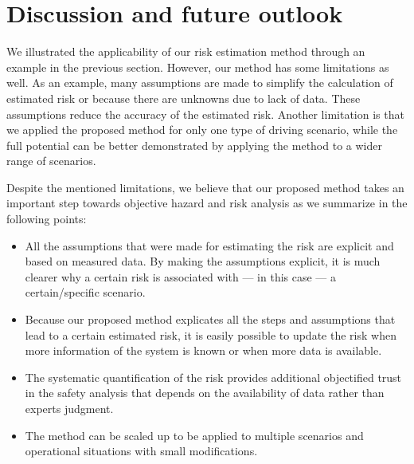 \section{Discussion and future outlook} %
\label{sec:discussion}



We illustrated the applicability of our risk estimation method through an example in the previous section. 
However, our method has some limitations as well. 
As an example, many assumptions are made to simplify the calculation of estimated risk or because there are unknowns due to lack of data. These assumptions reduce the accuracy of the estimated risk. 
Another limitation is that we applied the proposed method for only one type of driving scenario, while the full potential can be better demonstrated by applying the method to a wider range of scenarios.

Despite the mentioned limitations, we believe that our proposed method  takes an important step towards objective hazard and risk analysis as we summarize in the following points: 
\begin{itemize}
	\item All the assumptions that were made for estimating the risk are explicit and based on measured data. By making the assumptions explicit, it is much clearer why a certain risk is associated with --- in this case --- a certain/specific scenario.
	\item Because our proposed method explicates all the steps and assumptions that lead to a certain estimated risk, it is easily possible to update the risk when more information of the system is known or when more data is available.
	\item The systematic quantification of the risk provides additional objectified trust in the safety analysis that depends on the availability of data rather than experts judgment. 
	\item The method can be scaled up to be applied to multiple scenarios and operational situations with small modifications. 
\end{itemize}





